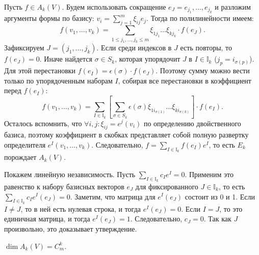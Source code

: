 \begin{myproof}
	Пусть $f \in A_k(V)$. Будем использовать сокращение $e_J = e_{j_1}, \dotsc, e_{j_k}$ и разложим аргументы формы по базису: $v_i = \sum \limits_{j=1}^m \xi_{ij} e_j$. Тогда по полилинейности имеем:
	\[ f(v_1, \dotsc, v_k) = \sum_{1 \leq j_1, \dotsc, j_k \leq m} \xi_{1 j_1} \dots \xi_{k j_k} \cdot f(e_J). \]
	Зафиксируем $J = (j_1, \dotsc, j_k)$. Если среди индексов в $J$ есть повторы, то $f(e_J) = 0$.
	Иначе найдется $\sigma \in S_k$, которая упорядочит $J$ в $I \in \mathbb{I}_k$ ($j_p = i_{\sigma(p)}$). Для этой перестановки $f(e_I) = \epsilon(\sigma) \cdot f(e_J)$.
	Поэтому сумму можно вести только по упорядоченным наборам $I$, собирая все перестановки в коэффициент перед $f(e_I)$:
	\[ f(v_1, \dotsc, v_k) = \sum_{I \in \mathbb{I}_k} \left[ \sum_{\sigma \in S_k} \epsilon(\sigma) \xi_{1 i_{\sigma(1)}} \dots \xi_{k i_{\sigma(k)}} \right] \cdot f(e_I) . \]
	Осталось вспомнить, что $\forall i,j : \xi_{ij} = e^j(v_i)$ по определению двойственного базиса, поэтому коэффициент в скобках представляет собой полную развертку определителя $e^I(v_1, \dotsc, v_k)$. 
	Следовательно, $f = \sum \limits_{I \in \mathbb{I}_k} f(e_I)  e^I$, то есть $E_k$ порождает $A_k(V)$.

	\vspace{5pt}
	Покажем линейную независимость.
	Пусть $\sum \limits_{I \in \mathbb{I}_k} c_I e^I = 0$. Применим это равенство к набору базисных векторов $e_J$ для фиксированного $J \in \mathbb{I}_k$, то есть $\sum_{I \in \mathbb{I}_k} c_I e^I(e_J) = 0$. 
	Заметим, что матрица для $e^I(e_J)$ состоит из 0 и 1. Если $I \neq J$, то в ней есть нулевая строка, и тогда $e^I(e_J) = 0$. Если $I=J$, то это единичная матрица, и тогда $e^I(e_J) = 1$.
	Следовательно, $c_J = 0$. Так как $J$ произвольно, это доказывает утверждение. 
\end{myproof}

\begin{corollary}
	$\dim A_k(V) = C_m^k$.
\end{corollary}